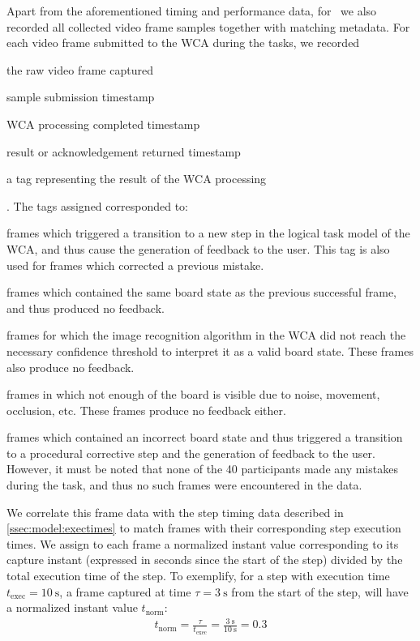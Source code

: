 Apart from the aforementioned timing and performance data, for~\cite{olguinmunoz:impact2021} we also recorded all collected video frame samples together with matching metadata.
For each video frame submitted to the \ac{WCA} during the tasks, we recorded
\begin{enumerate*}[itemjoin={{; }}, itemjoin*={{; and }}]
    \item the raw video frame captured
    \item sample submission timestamp
    \item \ac{WCA} processing completed timestamp
    \item result or acknowledgement returned timestamp
    \item a tag representing the result of the \ac{WCA} processing
\end{enumerate*}.
The tags assigned corresponded to:
\begin{description}[font={\bfseries\ttfamily}]
    \item[SUCCESS:] frames which triggered a transition to a new step in the logical task model of the \ac{WCA}, and thus cause the generation of feedback to the user.
    This tag is also used for frames which corrected a previous mistake.
    \item[REPEAT:] frames which contained the same board state as the previous successful frame, and thus produced no feedback.
    \item[LOW\_CONFIDENCE] frames for which the image recognition algorithm in the \ac{WCA} did not reach the necessary confidence threshold to interpret it as a valid board state.
    These frames also produce no feedback.
    \item[BLANK] frames in which not enough of the board is visible due to noise, movement, occlusion, etc.
    These frames produce no feedback either.
    \item[TASK\_ERROR] frames which contained an incorrect board state and thus triggered a transition to a procedural corrective step and the generation of feedback to the user.
    However, it must be noted that none of the \num{40} participants made any mistakes during the task, and thus no such frames were encountered in the data.
\end{description}

We correlate this frame data with the step timing data described in \cref{ssec:model:exectimes} to match frames with their corresponding step execution times.
We assign to each frame a normalized instant value corresponding to its capture instant (expressed in seconds since the start of the step) divided by the total execution time of the step.
To exemplify, for a step with execution time \( t_\text{exec} = \SI{10}{\second} \), a frame captured at time \( \tau = \SI{3}{\second} \) from the start of the step, will have a normalized instant value \( t_\text{norm} \):
\begin{align}
    t_\text{norm} = \frac{\tau}{t_\text{exec}} = \frac{\SI{3}{\second}}{\SI{10}{\second}} = 0.3
\end{align}

